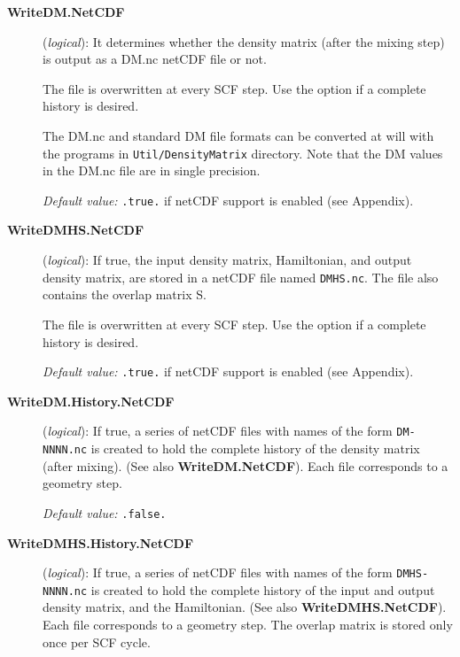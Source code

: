 \begin{description}

\item[\textbf{WriteDM.NetCDF}] (\textit{logical}): 
 It determines whether the density matrix
(after the mixing step) is output as a DM.nc netCDF file or not.

The file is overwritten at every SCF step. Use the  option if a complete history is desired.

The DM.nc and standard DM file formats can be converted at will with
the programs in \texttt{Util/DensityMatrix} directory. Note that the
DM values in the DM.nc file are in single precision.

\textit{Default value:} \texttt{.true.} if netCDF support is enabled (see Appendix).

\item[\textbf{WriteDMHS.NetCDF}] (\textit{logical}): 
If true, the input density matrix, Hamiltonian, and output density matrix, are stored in a netCDF file
named \texttt{DMHS.nc}. The file also contains the overlap matrix S.

The file is overwritten at every SCF step. Use the  option if a complete history is desired.

\textit{Default value:} \texttt{.true.} if netCDF support is enabled (see Appendix).

\item[\textbf{WriteDM.History.NetCDF}] (\textit{logical}):
 If
true, a series of netCDF files with names of the form \texttt{DM-NNNN.nc}
is created to hold the complete history of the density matrix (after
mixing).  (See also \textbf{WriteDM.NetCDF}). Each file corresponds to a
geometry step.

\textit{Default value:} \texttt{.false.}

\item[\textbf{WriteDMHS.History.NetCDF}] (\textit{logical}):
 If true, a series of netCDF
files with names of the form \texttt{DMHS-NNNN.nc} is created to hold the
complete history of the input and output density matrix, and the
Hamiltonian.  (See also \textbf{WriteDMHS.NetCDF}). Each file corresponds
to a geometry step. The overlap matrix is stored only once per SCF
cycle.


\end{description}
